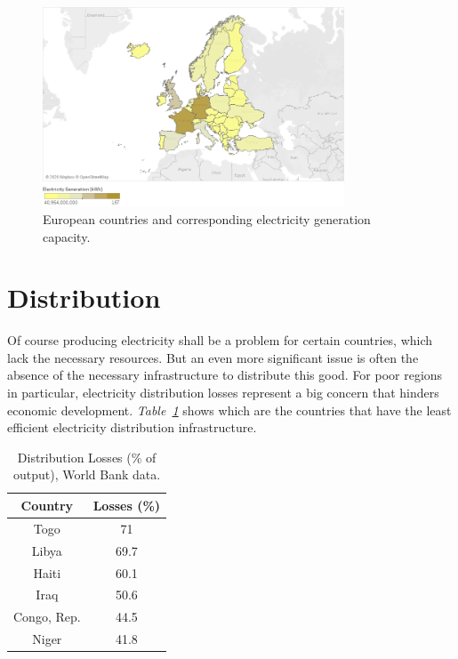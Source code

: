 \documentclass[a4paper,12pt]{book}
\begin{document}
\begin{figure}[tb]
\begin{center}
\captionsetup{justification=centering}
\includegraphics[width=0.8\textwidth]{Images/prod.png}
\caption{European countries and corresponding electricity generation capacity. }
\label{fig:capacity}
\end{center}
\end{figure}

\section{Distribution}

Of course producing electricity shall be a problem for certain countries, which lack the necessary resources. But an even more significant issue is often the absence of the necessary infrastructure to distribute this good. For poor regions in particular, electricity distribution losses represent a big concern that hinders economic development. \textit{Table~\ref{fig:losses}} shows which are the countries that have the least efficient electricity distribution infrastructure.

\begin{table}[tb]
\begin{center}
\begin{tabular}{|c|c|}
\hline
Country & Losses (\%)\\
\hline
Togo & 71\\
Libya & 69.7\\
Haiti & 60.1\\
Iraq & 50.6\\
Congo, Rep. & 44.5\\
Niger & 41.8\\
\hline
\end{tabular}
\caption{Distribution Losses (\% of output), World Bank data.}
\label{fig:losses}
\end{center}
\end{table}
\end{document}

